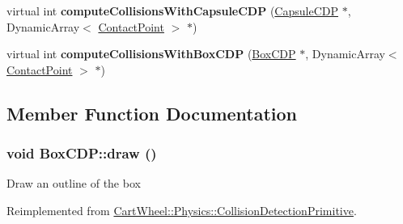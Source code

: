 \begin{DoxyCompactItemize}
\item 
\hypertarget{classCartWheel_1_1Physics_1_1BoxCDP_a01990b84e07298efbb25159e88846969}{
virtual int {\bfseries computeCollisionsWithCapsuleCDP} (\hyperlink{classCartWheel_1_1Physics_1_1CapsuleCDP}{CapsuleCDP} $\ast$, DynamicArray$<$ \hyperlink{classCartWheel_1_1Physics_1_1ContactPoint}{ContactPoint} $>$ $\ast$)}
\label{classCartWheel_1_1Physics_1_1BoxCDP_a01990b84e07298efbb25159e88846969}

\item 
\hypertarget{classCartWheel_1_1Physics_1_1BoxCDP_a7c8d228d0650be692ae62e14fa179c3d}{
virtual int {\bfseries computeCollisionsWithBoxCDP} (\hyperlink{classCartWheel_1_1Physics_1_1BoxCDP}{BoxCDP} $\ast$, DynamicArray$<$ \hyperlink{classCartWheel_1_1Physics_1_1ContactPoint}{ContactPoint} $>$ $\ast$)}
\label{classCartWheel_1_1Physics_1_1BoxCDP_a7c8d228d0650be692ae62e14fa179c3d}

\end{DoxyCompactItemize}


\subsection{Member Function Documentation}
\hypertarget{classCartWheel_1_1Physics_1_1BoxCDP_a30fe03a4419ba85988a0d909b42f9c3d}{
\subsubsection[{draw}]{\setlength{\rightskip}{0pt plus 5cm}void BoxCDP::draw ()}}
\label{classCartWheel_1_1Physics_1_1BoxCDP_a30fe03a4419ba85988a0d909b42f9c3d}
Draw an outline of the box 

Reimplemented from \hyperlink{classCartWheel_1_1Physics_1_1CollisionDetectionPrimitive_a26c85561d35a7df8bb48697da9c1cb10}{CartWheel::Physics::CollisionDetectionPrimitive}.

